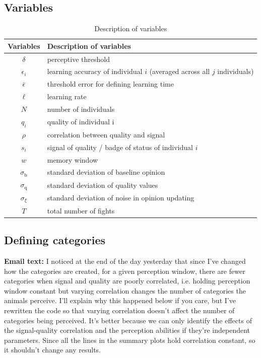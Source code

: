 \subsection*{Variables}
%
\begin {table}[h]
\caption {Description of variables} \label{tab:vars} 
\begin{tabular}{cl}
\toprule
 Variables & Description of variables \\
\midrule 
$\delta$ & perceptive threshold \\
$\epsilon_i$ & learning accuracy of individual $i$ (averaged across all $j$ individuals) \\
$\bar{\epsilon}$ & threshold error for defining learning time \\
$\ell$ & learning rate \\
$N$ & number of individuals \\ 
 $q_i$ & quality of individual i \\ 
$\rho$ & correlation between quality and signal \\
$s_i$ & signal of quality / badge of status of individual $i$ \\ 
$w$ & memory window \\
$\sigma_\text{b}$ & standard deviation of baseline opinion \\
$\sigma_\text{q}$ & standard deviation of quality values \\
$\sigma_\xi$ & standard deviation of noise in opinion updating \\
$T$ & total number of fights \\
\bottomrule
\end{tabular}
\end {table}
%
\subsection*{Defining categories}
%
\textbf{Email text: }I noticed at the end of the day yesterday that since I've changed how the categories are created, for a given perception window, there are fewer categories when signal and quality are poorly correlated, i.e. holding perception window constant but varying correlation changes the number of categories the animals perceive. I'll explain why this happened below if you care, but I've rewritten the code so that varying correlation doesn't affect the number of categories being perceived. It's better because we can only identify the effects of the signal-quality correlation and the perception abilities if they're independent parameters. Since all the lines in the summary plots hold correlation constant, so it shouldn't change any results. 


